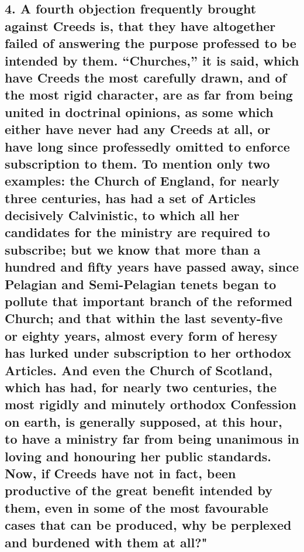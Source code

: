 \documentclass[
]{book}
\begin{document}
{\subsection{4. A fourth objection frequently brought against Creeds is, that they have altogether failed of answering the purpose professed to be intended by them. ``Churches,'' it is said, which have Creeds the most carefully drawn, and of the most rigid character, are as far from being united in doctrinal opinions, as some which either have never had any Creeds at all, or have long since professedly omitted to enforce subscription to them. To mention only two examples: the Church of England, for nearly three centuries, has had a set of Articles decisively Calvinistic, to which all her candidates for the ministry are required to subscribe; but we know that more than a hundred and fifty years have passed away, since Pelagian and Semi-Pelagian tenets began to pollute that important branch of the reformed Church; and that within the last seventy-five or eighty years, almost every form of heresy has lurked under subscription to her orthodox Articles. And even the Church of Scotland, which has had, for nearly two centuries, the most rigidly and minutely orthodox Confession on earth, is generally supposed, at this hour, to have a ministry far from being unanimous in loving and honouring her public standards. Now, if Creeds have not in fact, been productive of the great benefit intended by them, even in some of the most favourable cases that can be produced, why be perplexed and burdened with them at all?"}\label{a-fourth-objection-frequently-brought-against-creeds-is-that-they-have-altogether-failed-of-answering-the-purpose-professed-to-be-intended-by-them.-churches-it-is-said-which-have-creeds-the-most-carefully-drawn-and-of-the-most-rigid-character-are-as-far-from-being-united-in-doctrinal-opinions-as-some-which-either-have-never-had-any-creeds-at-all-or-have-long-since-professedly-omitted-to-enforce-subscription-to-them.-to-mention-only-two-examples-the-church-of-england-for-nearly-three-centuries-has-had-a-set-of-articles-decisively-calvinistic-to-which-all-her-candidates-for-the-ministry-are-required-to-subscribe-but-we-know-that-more-than-a-hundred-and-fifty-years-have-passed-away-since-pelagian-and-semi-pelagian-tenets-began-to-pollute-that-important-branch-of-the-reformed-church-and-that-within-the-last-seventy-five-or-eighty-years-almost-every-form-of-heresy-has-lurked-under-subscription-to-her-orthodox-articles.-and-even-the-church-of-scotland-which-has-had-for-nearly-two-centuries-the-most-rigidly-and-minutely-orthodox-confession-on-earth-is-generally-supposed-at-this-hour-to-have-a-ministry-far-from-being-unanimous-in-loving-and-honouring-her-public-standards.-now-if-creeds-have-not-in-fact-been-productive-of-the-great-benefit-intended-by-them-even-in-some-of-the-most-favourable-cases-that-can-be-produced-why-be-perplexed-and-burdened-with-them-at-all}}
\end{document}

